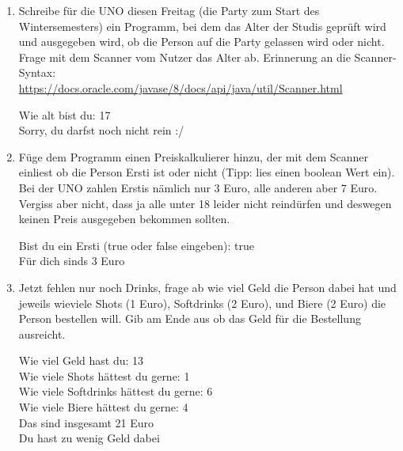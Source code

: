 \documentclass{../../sheet}
\begin{document}
\begin{enumerate}
    \item Schreibe für die UNO diesen Freitag (die Party zum Start des Wintersemesters) ein Programm, bei dem das Alter der Studis geprüft wird und ausgegeben wird, ob die Person auf die Party gelassen wird oder nicht. Frage mit dem Scanner vom Nutzer das Alter ab. Erinnerung an die Scanner-Syntax:\\ \url{https://docs.oracle.com/javase/8/docs/api/java/util/Scanner.html}
    \begin{ausgabe}
        Wie alt bist du: 17\\
        Sorry, du darfst noch nicht rein :/
    \end{ausgabe}
    \item Füge dem Programm einen Preiskalkulierer hinzu, der mit dem Scanner einliest ob die Person Ersti ist oder nicht (Tipp: lies einen boolean Wert ein). Bei der UNO zahlen Erstis nämlich nur 3 Euro, alle anderen aber 7 Euro. Vergiss aber nicht, dass ja alle unter 18 leider nicht reindürfen und deswegen keinen Preis ausgegeben bekommen sollten.
          \begin{ausgabe}
              Bist du ein Ersti (true oder false eingeben): true\\
              Für dich sinds 3 Euro
          \end{ausgabe}
    \item Jetzt fehlen nur noch Drinks, frage ab wie viel Geld die Person dabei hat und jeweils wieviele Shots (1 Euro), Softdrinks (2 Euro), und Biere (2 Euro) die Person bestellen will. Gib am Ende aus ob das Geld für die Bestellung ausreicht.
          \begin{ausgabe}
              Wie viel Geld hast du: 13\\
              Wie viele Shots hättest du gerne: 1\\
              Wie viele Softdrinks hättest du gerne: 6\\
              Wie viele Biere hättest du gerne: 4\\
              Das sind insgesamt 21 Euro\\
              Du hast zu wenig Geld dabei
          \end{ausgabe}
\end{enumerate}
\end{document}
